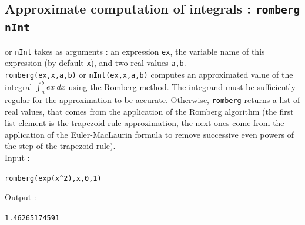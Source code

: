 \documentclass[a4paper,11pt]{book}
\begin{document}
\subsection{Approximate computation of integrals : {\tt romberg nInt}}
 or {\tt nInt} takes as arguments : an expression 
{\tt ex}, the variable name of this expression (by default {\tt x}), and 
two real values {\tt a,b}.\\
{\tt romberg(ex,x,a,b)} or {\tt nInt(ex,x,a,b)} computes an approximated 
value of the integral  $\int_a^b ex\ dx$ using the Romberg method. The
integrand must be sufficiently regular for the approximation to
be accurate. Otherwise, {\tt romberg} returns a list of real values,
that comes from the application of the
Romberg algorithm (the first list element is
the trapezoid rule approximation, the next ones come from the application
of the Euler-MacLaurin formula to remove successive even powers of
the step of the trapezoid rule).\\
Input :
\begin{center}{\tt romberg(exp(x\verb|^|2),x,0,1)}\end{center}
Output :
\begin{center}{\tt 1.46265174591}\end{center}
\end{document}
